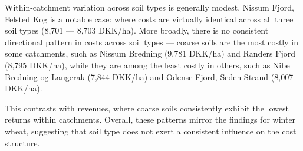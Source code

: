 \documentclass[12pt]{article}
\begin{document}
Within-catchment variation across soil types is generally modest. 
Nissum Fjord, Felsted Kog is a notable case: where costs are virtually identical across all three soil types (8,701 --- 8,703 DKK/ha). 
More broadly, there is no consistent directional pattern in costs across soil types --- coarse soils are the most costly in some catchments, such as Nissum Bredning (9,781 DKK/ha) and Randers Fjord (8,795 DKK/ha), while they are among the least costly in others, such as Nibe Bredning og Langerak (7,844 DKK/ha) and Odense Fjord, Seden Strand (8,007 DKK/ha). 

This contrasts with revenues, where coarse soils consistently exhibit the lowest returns within catchments. Overall, these patterns mirror the findings for winter wheat, suggesting that soil type does not exert a consistent influence on the cost structure.
\end{document}
